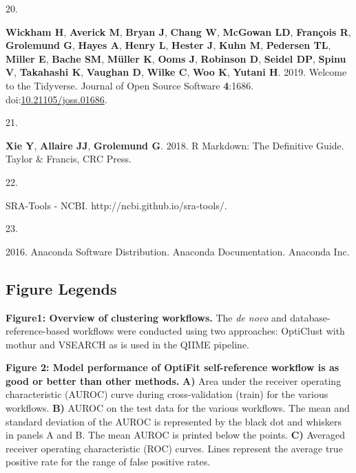\documentclass[
]{article}
\newlength{\cslhangindent}
\newlength{\csllabelwidth}
\newlength{\cslentryspacingunit} %
\newenvironment{CSLReferences}[2] %
 {%
  \setlength{\parindent}{0pt}
  \ifodd #1
  \let\oldpar\par
  \def\par{\hangindent=\cslhangindent\oldpar}
  \fi
  \setlength{\parskip}{#2\cslentryspacingunit}
 }%
 {}
\newcommand{\CSLLeftMargin}[1]{\parbox[t]{\csllabelwidth}{#1}}
\newcommand{\CSLRightInline}[1]{\parbox[t]{\linewidth - \csllabelwidth}{#1}\break}
\begin{document}
\begin{CSLReferences}{0}{1}
\leavevmode{}%
\CSLLeftMargin{20. }%
\CSLRightInline{\textbf{Wickham H}, \textbf{Averick M}, \textbf{Bryan
J}, \textbf{Chang W}, \textbf{McGowan LD}, \textbf{François R},
\textbf{Grolemund G}, \textbf{Hayes A}, \textbf{Henry L}, \textbf{Hester
J}, \textbf{Kuhn M}, \textbf{Pedersen TL}, \textbf{Miller E},
\textbf{Bache SM}, \textbf{Müller K}, \textbf{Ooms J}, \textbf{Robinson
D}, \textbf{Seidel DP}, \textbf{Spinu V}, \textbf{Takahashi K},
\textbf{Vaughan D}, \textbf{Wilke C}, \textbf{Woo K}, \textbf{Yutani H}.
2019. Welcome to the Tidyverse. Journal of Open Source Software
\textbf{4}:1686.
doi:\href{https://doi.org/10.21105/joss.01686}{10.21105/joss.01686}.}

\leavevmode{}%
\CSLLeftMargin{21. }%
\CSLRightInline{\textbf{Xie Y}, \textbf{Allaire JJ}, \textbf{Grolemund
G}. 2018. R {Markdown}: {The Definitive Guide}. {Taylor \& Francis, CRC
Press}.}

\leavevmode{}%
\CSLLeftMargin{22. }%
\CSLRightInline{{SRA}-{Tools} - {NCBI}.
http://ncbi.github.io/sra-tools/.}

\leavevmode{}%
\CSLLeftMargin{23. }%
\CSLRightInline{2016. Anaconda {Software Distribution}. Anaconda
Documentation. Anaconda Inc.}

\end{CSLReferences}

\setlength{\parindent}{0in}
\setlength{\leftskip}{0in}

\newpage

\hypertarget{figure-legends}{%
\subsection{Figure Legends}\label{figure-legends}}

\textbf{Figure1: Overview of clustering workflows.} The \emph{de novo}
and database-reference-based workflows were conducted using two
approaches: OptiClust with mothur and VSEARCH as is used in the QIIME
pipeline.

\textbf{Figure 2: Model performance of OptiFit self-reference workflow
is as good or better than other methods.} \textbf{A)} Area under the
receiver operating characteristic (AUROC) curve during cross-validation
(train) for the various workflows. \textbf{B)} AUROC on the test data
for the various workflows. The mean and standard deviation of the AUROC
is represented by the black dot and whiskers in panels A and B. The mean
AUROC is printed below the points. \textbf{C)} Averaged receiver
operating characteristic (ROC) curves. Lines represent the average true
positive rate for the range of false positive rates.
\end{document}
